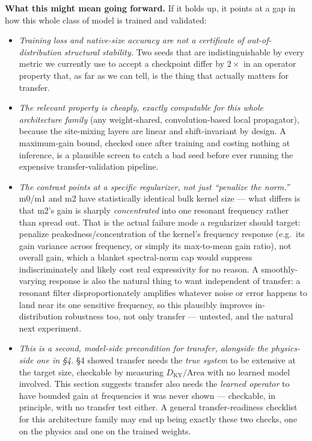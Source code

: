 \documentclass[11pt]{article}
\begin{document}
\textbf{What this might mean going forward.} If it holds up, it points
at a gap in how this whole class of model is trained and validated:

\begin{itemize}[nosep]
\item \emph{Training loss and native-size accuracy are not a
  certificate of out-of-distribution structural stability.} Two seeds
  that are indistinguishable by every metric we currently use to accept
  a checkpoint differ by $2\times$ in an operator property that, as far
  as we can tell, is the thing that actually matters for transfer.
\item \emph{The relevant property is cheaply, exactly computable for
  this whole architecture family} (any weight-shared, convolution-based
  local propagator), because the site-mixing layers are linear and
  shift-invariant by design. A maximum-gain bound, checked once after
  training and costing nothing at inference, is a plausible screen to
  catch a bad seed before ever running the expensive transfer-validation
  pipeline.
\item \emph{The contrast points at a specific regularizer, not just
  ``penalize the norm.''} m0/m1 and m2 have statistically identical bulk
  kernel size --- what differs is that m2's gain is sharply
  \emph{concentrated} into one resonant frequency rather than spread out.
  That is the actual failure mode a regularizer should target: penalize
  peakedness/concentration of the kernel's frequency response (e.g.\ its
  gain variance across frequency, or simply its max-to-mean gain ratio),
  not overall gain, which a blanket spectral-norm cap would suppress
  indiscriminately and likely cost real expressivity for no reason. A
  smoothly-varying response is also the natural thing to want
  independent of transfer: a resonant filter disproportionately amplifies
  whatever noise or error happens to land near its one sensitive
  frequency, so this plausibly improves in-distribution robustness too,
  not only transfer --- untested, and the natural next experiment.
\item \emph{This is a second, model-side precondition for transfer,
  alongside the physics-side one in \S4.} \S4 showed transfer needs the
  \emph{true system} to be extensive at the target size, checkable by
  measuring $D_{\mathrm{KY}}/\mathrm{Area}$ with no learned model
  involved. This section suggests transfer also needs the \emph{learned
  operator} to have bounded gain at frequencies it was never shown ---
  checkable, in principle, with no transfer test either. A general
  transfer-readiness checklist for this architecture family may end up
  being exactly these two checks, one on the physics and one on the
  trained weights.
\end{itemize}
\end{document}
